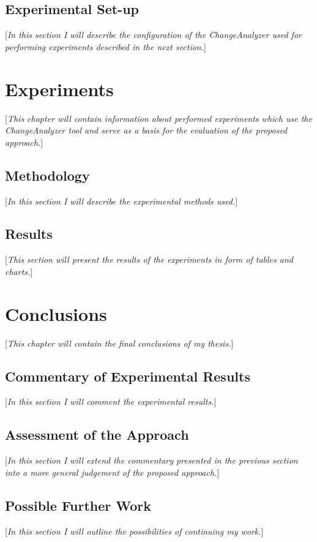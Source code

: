 \documentclass{pracamgr}
\begin{document}
\section{Experimental Set-up}
[\textit{In this section I will describe the configuration of the ChangeAnalyzer used for performing experiments described in the next section.}]

\chapter{Experiments}
[\textit{This chapter will contain information about performed experiments which use the ChangeAnalyzer tool and serve as a basis for the evaluation of the proposed approach.}]

\section{Methodology}
[\textit{In this section I will describe the experimental methods used.}]

\section{Results}
[\textit{This section will present the results of the experiments in form of tables and charts.}]

\chapter{Conclusions}
[\textit{This chapter will contain the final conclusions of my thesis.}]

\section{Commentary of Experimental Results}
[\textit{In this section I will comment the experimental results.}]

\section{Assessment of the Approach}
[\textit{In this section I will extend the commentary presented in the previous section into a more general judgement of the proposed approach.}]

\section{Possible Further Work}
[\textit{In this section I will outline the possibilities of continuing my work.}]
\end{document}
